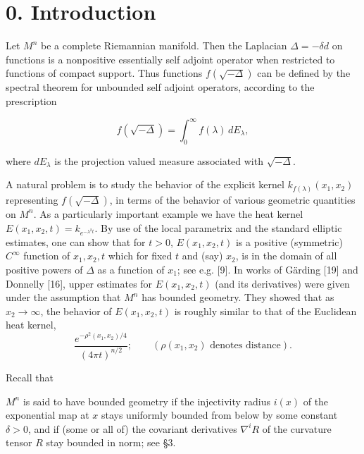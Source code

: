 \chapter{0. Introduction}


Let $M^n$ be a complete Riemannian manifold. Then the Laplacian $\Delta = -\delta d$
on functions is a nonpositive essentially self adjoint operator when restricted to
functions of compact support. Thus functions $f(\sqrt{-\Delta})$ can be defined by the
spectral theorem for unbounded self adjoint operators, according to the
prescription

\begin{equation}
\tag{0.1}
f(\sqrt{-\Delta}) = \int_0^\infty f(\lambda)\, dE_\lambda,
\end{equation}

where $dE_\lambda$ is the projection valued measure associated with $\sqrt{-\Delta}$.

A natural problem is to study the behavior of the explicit kernel $k_{f(\lambda)}(x_1, x_2)$
representing $f(\sqrt{-\Delta})$, in terms of the behavior of various geometric quantities
on $M^n$. As a particularly important example we have the heat kernel
$E(x_1, x_2, t) = k_{e^{-\lambda^2 t}}$. By use of the local parametrix and the standard elliptic
estimates, one can show that for $t > 0$, $E(x_1, x_2, t)$ is a positive (symmetric)
$C^\infty$ function of $x_1, x_2, t$ which for fixed $t$ and (say) $x_2$, is in the domain of all
positive powers of $\Delta$ as a function of $x_1$; see e.g. [9]. In works of G\"arding [19]
and Donnelly [16], upper estimates for $E(x_1, x_2, t)$ (and its derivatives) were
given under the assumption that $M^n$ has bounded geometry. They showed that
as $x_2 \to \infty$, the behavior of $E(x_1, x_2, t)$ is roughly similar to that of the
Euclidean heat kernel,
\[
\frac{e^{-\rho^2(x_1, x_2)/4}}{(4\pi t)^{n/2}};
\qquad (\rho(x_1, x_2)\text{ denotes distance}).
\]

Recall that

$M^n$ is said to have bounded geometry if the injectivity radius $i(x)$ of the
exponential map at $x$ stays uniformly bounded from below by some constant
$\delta>0$, and if (some or all of) the covariant derivatives $\nabla^i R$ of the
curvature tensor $R$ stay bounded in norm; see \S 3.

